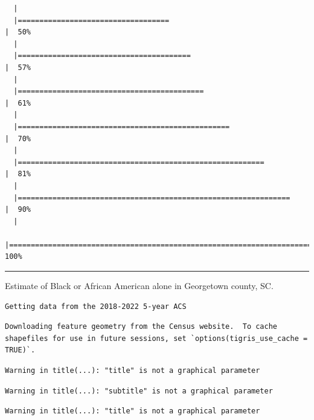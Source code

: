 \documentclass[
  letterpaper,
  DIV=11,
  numbers=noendperiod]{scrartcl}
\begin{document}
\begin{verbatim}
  |                                                                            
  |===================================                                   |  50%
  |                                                                            
  |========================================                              |  57%
  |                                                                            
  |===========================================                           |  61%
  |                                                                            
  |=================================================                     |  70%
  |                                                                            
  |=========================================================             |  81%
  |                                                                            
  |===============================================================       |  90%
  |                                                                            
  |======================================================================| 100%
\end{verbatim}

\begin{center}\rule{0.5\linewidth}{0.5pt}\end{center}

Estimate of Black or African American alone in Georgetown county, SC.

\begin{verbatim}
Getting data from the 2018-2022 5-year ACS
\end{verbatim}

\begin{verbatim}
Downloading feature geometry from the Census website.  To cache shapefiles for use in future sessions, set `options(tigris_use_cache = TRUE)`.
\end{verbatim}

\begin{verbatim}
Warning in title(...): "title" is not a graphical parameter
\end{verbatim}

\begin{verbatim}
Warning in title(...): "subtitle" is not a graphical parameter
\end{verbatim}

\begin{verbatim}
Warning in title(...): "title" is not a graphical parameter
\end{verbatim}
\end{document}
